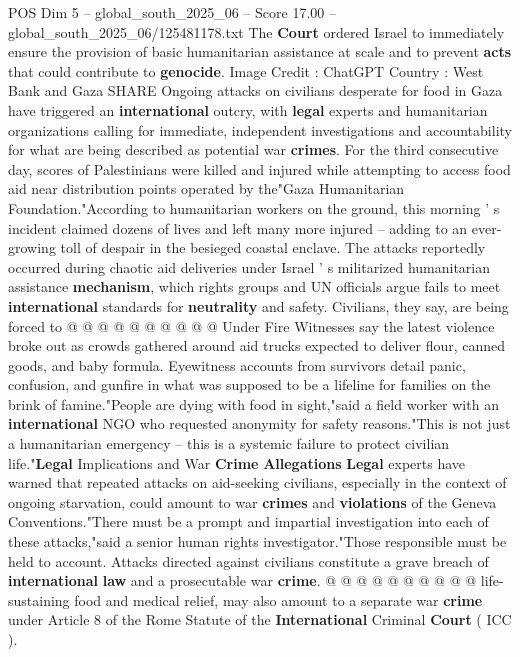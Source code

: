 \begin{textsample}{POS Dim 5 – global\_south\_2025\_06 – Score 17.00 – global\_south\_2025\_06/125481178.txt}  \label{ex:f5_pos_043}
The \textbf{Court} ordered Israel to immediately ensure the provision of basic humanitarian assistance at scale and to prevent \textbf{acts} that could contribute to \textbf{genocide}.
Image Credit : ChatGPT Country : West Bank and Gaza SHARE Ongoing attacks on civilians desperate for food in Gaza have triggered an \textbf{international} outcry, with \textbf{legal} experts and humanitarian organizations calling for immediate, independent investigations and accountability for what are being described as potential war \textbf{crimes}.
For the third consecutive day, scores of Palestinians were killed and injured while attempting to access food aid near distribution points operated by the"Gaza Humanitarian Foundation."According to humanitarian workers on the ground, this morning ' s incident claimed dozens of lives and left many more injured -- adding to an ever-growing toll of despair in the besieged coastal enclave.
The attacks reportedly occurred during chaotic aid deliveries under Israel ' s militarized humanitarian assistance \textbf{mechanism}, which rights groups and UN officials argue fails to meet \textbf{international} standards for \textbf{neutrality} and safety.
Civilians, they say, are being forced to @ @ @ @ @ @ @ @ @ @ Under Fire Witnesses say the latest violence broke out as crowds gathered around aid trucks expected to deliver flour, canned goods, and baby formula.
Eyewitness accounts from survivors detail panic, confusion, and gunfire in what was supposed to be a lifeline for families on the brink of famine."People are dying with food in sight,"said a field worker with an \textbf{international} NGO who requested anonymity for safety reasons."This is not just a humanitarian emergency -- this is a systemic failure to protect civilian life."\textbf{Legal} Implications and War \textbf{Crime} \textbf{Allegations} \textbf{Legal} experts have warned that repeated attacks on aid-seeking civilians, especially in the context of ongoing starvation, could amount to war \textbf{crimes} and \textbf{violations} of the Geneva Conventions."There must be a prompt and impartial investigation into each of these attacks,"said a senior human rights investigator."Those responsible must be held to account.
Attacks directed against civilians constitute a grave breach of \textbf{international} \textbf{law} and a prosecutable war \textbf{crime}. @ @ @ @ @ @ @ @ @ @ life-sustaining food and medical relief, may also amount to a separate war \textbf{crime} under Article 8 of the Rome Statute of the \textbf{International} Criminal \textbf{Court} ( ICC ).

\end{textsample}
